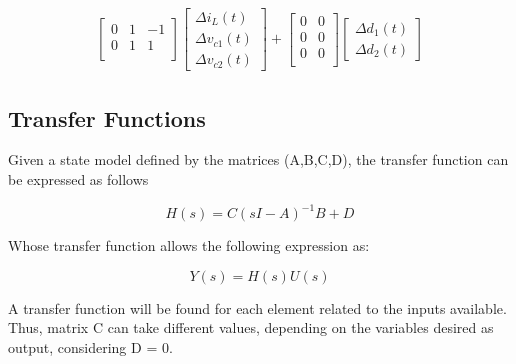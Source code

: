 \begin{align}
\begin{bmatrix}
        	0 & 1 & -1 \\
        	0 & 1 & 1 \\
    	\end{bmatrix}
    	\begin{bmatrix}
        	\Delta{i}_{L}(t)\\
        	\Delta{v}_{c1}(t)\\
                \Delta{v}_{c2}(t)
    	\end{bmatrix}
    	+
    	\begin{bmatrix}
        	0 & 0 \\
        	0 & 0 \\
                0 & 0 \\
    	\end{bmatrix}
    	\begin{bmatrix}
        	\Delta{d}_{1}(t) \\
        	\Delta{d}_{2}(t)
    	\end{bmatrix}
\end{align}


\subsection{Transfer Functions}

Given a state model defined by the matrices (A,B,C,D), the transfer function can be expressed as follows

\begin{equation*}
    H(s)=C{(sI-A)}^{-1}B+D
\end{equation*}

Whose transfer function allows the following expression as:

\begin{equation}
    Y(s)=H(s)U(s)
\end{equation}

A transfer function will be found for each element related to the inputs available. Thus, matrix C can take different values, depending on the variables desired as output, considering D = 0.


